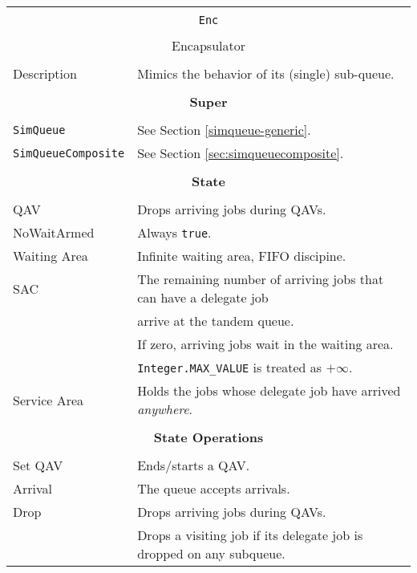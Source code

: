 \begin{tabular}{|l|l|}
	\hline
	\multicolumn{2}{|c|}{} \\
	\multicolumn{2}{|c|}{\lstinline[basicstyle=\large]{Enc}} \\
	\multicolumn{2}{|c|}{} \\
	\multicolumn{2}{|c|}{Encapsulator} \\
	\multicolumn{2}{|c|}{} \\
	\hline
	Description & Mimics the behavior of its (single) sub-queue. \\
	\hline
	\multicolumn{2}{|c|}{} \\
	\multicolumn{2}{|c|}{\bf Super} \\
	\multicolumn{2}{|c|}{} \\
	\hline
	\lstinline|SimQueue| & See Section \ref{simqueue-generic}. \\
	\lstinline|SimQueueComposite| & See Section \ref{sec:simqueuecomposite}. \\
	\hline
	\multicolumn{2}{|c|}{} \\
	\multicolumn{2}{|c|}{\bf State} \\
	\multicolumn{2}{|c|}{} \\
	\hline
	QAV & Drops arriving jobs during QAVs. \\
	\hline
	NoWaitArmed & Always \lstinline|true|. \\
	\hline
	Waiting Area & Infinite waiting area, FIFO discipine. \\
	\hline
	SAC & The remaining number of arriving jobs that can have a delegate job \\
	& arrive at the tandem queue. \\
	& If zero, arriving jobs wait in the waiting area. \\
	& \lstinline|Integer.MAX_VALUE| is treated as $+\infty$. \\
	\hline
	Service Area & Holds the jobs whose delegate job have arrived {\em anywhere}. \\
	\hline
	\multicolumn{2}{|c|}{} \\
	\multicolumn{2}{|c|}{\bf State Operations} \\
	\multicolumn{2}{|c|}{} \\
	\hline
	Set QAV & Ends/starts a QAV. \\
	\hline
	Arrival & The queue accepts arrivals. \\
	\hline
	Drop & Drops arriving jobs during QAVs. \\
	& Drops a visiting job if its delegate job is dropped on any subqueue. \\

\end{tabular}
